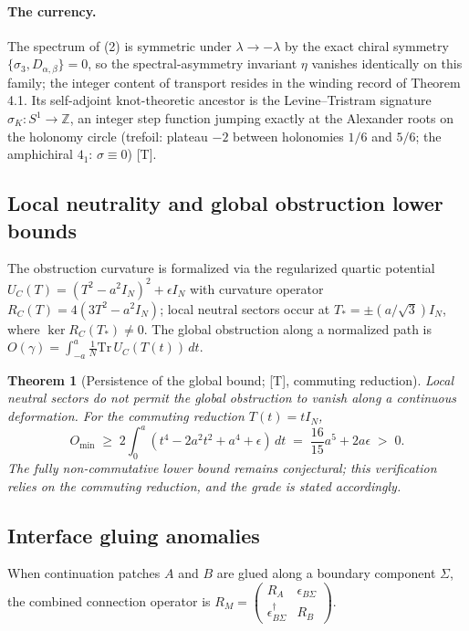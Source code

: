 \documentclass[11pt]{article}
\theoremstyle{definition}
\theoremstyle{plain}
\newtheorem{theorem}[definition]{Theorem}
\begin{document}
\paragraph{The currency.}
The spectrum of (2) is symmetric under $\lambda \to -\lambda$ by the exact chiral
symmetry $\{\sigma_3, D_{\alpha,\beta}\} = 0$, so the spectral-asymmetry invariant
$\eta$ vanishes identically on this family; the integer content of transport
resides in the winding record of Theorem 4.1. Its self-adjoint knot-theoretic
ancestor is the Levine--Tristram signature $\sigma_K : S^1 \to \mathbb{Z}$, an
integer step function jumping exactly at the Alexander roots on the holonomy circle
(trefoil: plateau $-2$ between holonomies $1/6$ and $5/6$; the amphichiral $4_1$:
$\sigma \equiv 0$) [T].

\subsection{Local neutrality and global obstruction lower bounds}

The obstruction curvature is formalized via the regularized quartic potential
$U_C(T) = (T^2 - a^2 I_N)^2 + \epsilon I_N$ with curvature operator
$R_C(T) = 4(3T^2 - a^2 I_N)$; local neutral sectors occur at
$T_* = \pm(a/\sqrt{3})I_N$, where $\ker R_C(T_*) \neq 0$. The global obstruction
along a normalized path is
$O(\gamma) = \int_{-a}^{a} \tfrac{1}{N}\mathrm{Tr}\,U_C(T(t))\,dt$.

\begin{theorem}[Persistence of the global bound; {[T]}, commuting reduction]
Local neutral sectors do not permit the global obstruction to vanish along a
continuous deformation. For the commuting reduction $T(t) = t I_N$,
\begin{equation}
O_{\min} \;\ge\; 2\int_0^a (t^4 - 2a^2t^2 + a^4 + \epsilon)\,dt
\;=\; \frac{16}{15}a^5 + 2a\epsilon \;>\; 0.
\end{equation}
The fully non-commutative lower bound remains conjectural; this verification relies
on the commuting reduction, and the grade is stated accordingly.
\end{theorem}

\subsection{Interface gluing anomalies}

When continuation patches $A$ and $B$ are glued along a boundary component
$\Sigma$, the combined connection operator is
$R_M = \left(\begin{smallmatrix} R_A & \epsilon_{B\Sigma} \\
\epsilon^{\dagger}_{B\Sigma} & R_B \end{smallmatrix}\right)$.
\end{document}
